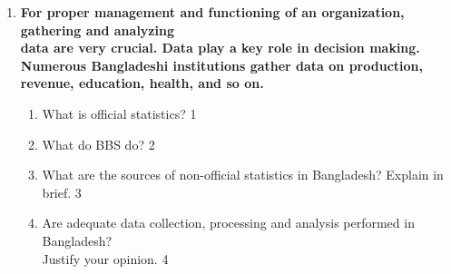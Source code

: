 \documentclass{article}
\begin{document}
\begin{enumerate}
  \item
	  \textbf{For proper management and functioning of an organization, gathering and analyzing \\ data are very crucial. Data play a key role in decision making. \\ Numerous Bangladeshi institutions gather data on production, revenue, education, health, and so on.}
  \begin{enumerate}
    \item
	What is official statistics? \hfill 1
    \item
	What do BBS do? \hfill 2
    \item  
	What are the sources of non-official statistics in Bangladesh? Explain in brief. \hfill 3
    \item
	Are adequate data collection, processing and analysis performed in Bangladesh? \\ Justify your opinion.  \hfill 4
\end{enumerate}
\end{enumerate}
\end{document}
